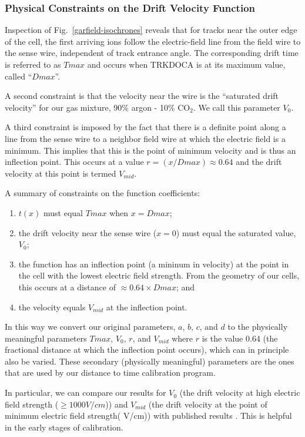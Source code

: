 \subsubsection{Physical Constraints on the Drift Velocity Function}

Inspection of Fig.~\ref{garfield-isochrones} reveals that for tracks near the outer
edge of the cell, the first arriving ions follow the electric-field line from 
the field wire to the sense wire, independent of track entrance angle.  The
corresponding drift time is referred to as $Tmax$ and occurs when TRKDOCA is at its maximum value,
called ``$Dmax$''.

A second constraint is that the velocity near the wire is the ``saturated drift velocity'' for our gas
mixture, 90$\%$ argon - 10$\%$ CO$_2$.  We call this parameter $V_0$.

A third constraint is imposed by the fact that there is a definite point along
a line from the sense wire to a neighbor field wire at which the electric field 
is a minimum. This implies that this is the point
of minimum velocity and is thus an inflection point. This occurs at a value
$r = (x/Dmax) \approx 0.64$ and the drift velocity at this point is termed $V_{mid}$.

A summary of constraints on the function coefficients:
\begin{enumerate}
\item  $t(x)$ must equal $Tmax$ when $x = Dmax $;
\item  the drift velocity near the sense wire ($x = 0$)
must equal the saturated value, $V_0$;
\item the function has an inflection point (a
mininum in velocity) at the point in the cell with the lowest electric field
strength.  From the geometry of our cells, this occurs at a distance
of $\approx 0.64 \times Dmax$; and
\item the velocity equals $V_{mid}$ at the inflection point.
\end{enumerate}

In this way we convert our original parameters, $a$, $b$, $c$, and $d$ to the physically meaningful
parameters $Tmax$, $V_0$, $r$, and $V_{mid}$ where $r$ is the value 0.64 (the fractional distance
at which the inflection point occurs), which can in principle also be varied.
These secondary (physically meaningful) parameters are the ones that are used
by our distance to time calibration program.

In particular, we can compare our results for $V_0$ (the drift velocity at high electric field strength
($\geq 1000 V/cm$)) and $V_{mid}$ (the drift velocity at the point of minimum electric field strength( V/cm))
with published results \cite{drift-velocity-results}.  This is helpful in the early stages of calibration.


